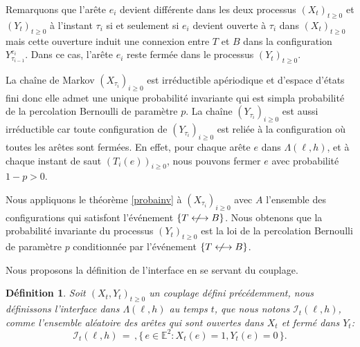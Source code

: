 \documentclass[titlepage,a4paper,12pt]{article}
\newcounter{def}
\newcounter{prop}
\newtheorem{interface}[def]{Définition}
\newcommand{\nlongleftrightarrow}{\longleftrightarrow \kern-15pt\not \kern15pt}
\begin{document}
Remarquons que l'arête $e_i$ devient différente dans les deux processus $(X_t)_{t\geqslant 0}$ et $(Y_t)_{t\geqslant 0}$ à l'instant $\tau_i$ si et seulement si $e_i$ devient ouverte à $\tau_i$ dans $(X_t)_{t\geqslant 0}$ mais cette ouverture induit une connexion entre $T$ et $B$ dans la configuration $Y_{\tau_{i-1}}^{e_{i}}$. Dans ce cas, l'arête $e_i$ reste fermée dans le processus $(Y_t)_{t\geqslant 0}$.

La chaîne de Markov $(X_{\tau_i})_{i\geqslant 0}$ est irréductible apériodique et d'espace d'états fini donc elle admet une unique probabilité invariante qui est simpla probabilité de la percolation Bernoulli de paramètre $p$. La chaîne $(Y_{\tau_i})_{i\geqslant 0}$ est aussi irréductible car toute configuration de $(Y_{\tau_i})_{i\geqslant 0}$ est reliée à la configuration où toutes les arêtes sont fermées. En effet, pour chaque arête $e$ dans $\Lambda(\ell,h)$, et à chaque instant de saut $(T_i(e))_{i\geqslant 0}$, nous pouvons fermer $e$ avec probabilité $1-p>0$.

Nous appliquons le théorème \ref{probainv} à $(X_{\tau_i})_{i\geqslant 0}$ avec $A$ l'ensemble des configurations qui satisfont l'événement $\{T\nlongleftrightarrow B\}$. Nous obtenons que la probabilité invariante du processus $(Y_t)_{t\geqslant 0}$ est la loi de la percolation Bernoulli de paramètre $p$ conditionnée par l'événement $\{T\nlongleftrightarrow B\}$.

Nous proposons la définition de l'interface en se servant du couplage.
\begin{interface}
Soit $(X_t,Y_t)_{t\geqslant 0}$ un couplage défini précédemment, nous définissons l'interface dans $\Lambda({\ell,h})$ au temps $t$, que nous notons $\mathcal{I}_t({\ell,h})$, comme l'ensemble aléatoire des arêtes qui sont ouvertes dans $X_t$ et fermé dans $Y_t$: $$ \mathcal{I}_t({\ell,h}) \,=\,, \big\{ \,e\in \mathbb{E}^2: X_t(e) = 1, Y_t(e) = 0 \, \big\}.
$$
\end{interface}
\end{document}
